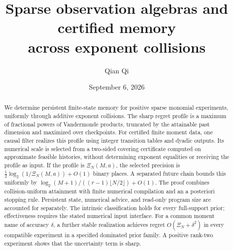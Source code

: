 \documentclass[11pt]{amsart}
\title[Certified memory across exponent collisions]{Sparse observation algebras and certified memory\\ across exponent collisions}
\author{Qian Qi}
\date{September 6, 2026}
\theoremstyle{definition}\newtheorem{definition}[theorem]{Definition}
\theoremstyle{remark}\newtheorem{remark}[theorem]{Remark}
\begin{document}
\begin{abstract}
We determine persistent finite-state memory for positive sparse monomial
experiments, uniformly through additive exponent collisions. The sharp
regret profile is a maximum of fractional powers of Vandermonde products,
truncated by the attainable past dimension and maximized over checkpoints.
For certified finite moment data, one causal filter realizes this profile
using integer transition tables and dyadic outputs. Its numerical scale
is selected from a two-sided covering certificate computed on approximate
feasible histories, without determining exponent equalities or receiving
the profile as input. If the profile is $\Xi_N(M,a)$, the selected
precision is $\frac12\log_2(1/\Xi_N(M,a))+O(1)$ binary places.
A separated future chain bounds this uniformly by
$\log_2(M+1)/((r-1)\lfloor N/2\rfloor)+O(1)$.
The proof combines collision-uniform attainment with finite numerical
compilation and an a posteriori stopping rule. Persistent state, numerical
advice, and read-only program size are accounted for separately.
The intrinsic classification holds for every full-support prior;
effectiveness requires the stated numerical input interface.
For a common moment name of accuracy $\delta$, a further stable realization
achieves regret $O(\Xi_N+\delta^2)$ in every compatible experiment in a
specified dominated prior family. A positive rank-two experiment
shows that the uncertainty term is sharp.
\end{abstract}
\maketitle












\appendix








\end{document}
